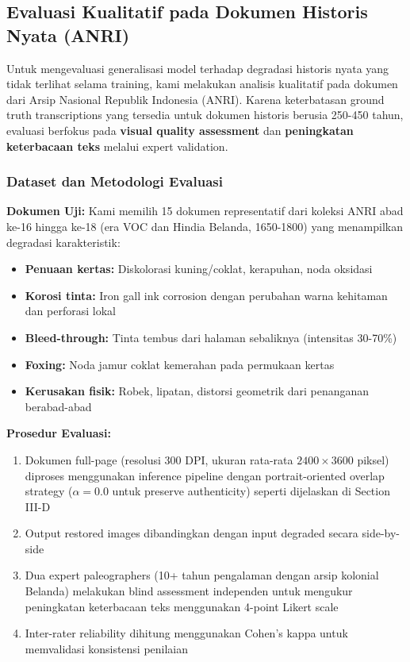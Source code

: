 
\subsection{Evaluasi Kualitatif pada Dokumen Historis Nyata (ANRI)}

Untuk mengevaluasi generalisasi model terhadap degradasi historis nyata yang tidak terlihat selama training, kami melakukan analisis kualitatif pada dokumen dari Arsip Nasional Republik Indonesia (ANRI). Karena keterbatasan ground truth transcriptions yang tersedia untuk dokumen historis berusia 250-450 tahun, evaluasi berfokus pada \textbf{visual quality assessment} dan \textbf{peningkatan keterbacaan teks} melalui expert validation.

\subsubsection{Dataset dan Metodologi Evaluasi}

\textbf{Dokumen Uji:} Kami memilih 15 dokumen representatif dari koleksi ANRI abad ke-16 hingga ke-18 (era VOC dan Hindia Belanda, 1650-1800) yang menampilkan degradasi karakteristik:
\begin{itemize}
    \item \textbf{Penuaan kertas:} Diskolorasi kuning/coklat, kerapuhan, noda oksidasi
    \item \textbf{Korosi tinta:} Iron gall ink corrosion dengan perubahan warna kehitaman dan perforasi lokal
    \item \textbf{Bleed-through:} Tinta tembus dari halaman sebaliknya (intensitas 30-70\%)
    \item \textbf{Foxing:} Noda jamur coklat kemerahan pada permukaan kertas
    \item \textbf{Kerusakan fisik:} Robek, lipatan, distorsi geometrik dari penanganan berabad-abad
\end{itemize}

\textbf{Prosedur Evaluasi:}
\begin{enumerate}
    \item Dokumen full-page (resolusi 300 DPI, ukuran rata-rata $2400 \times 3600$ piksel) diproses menggunakan inference pipeline dengan portrait-oriented overlap strategy ($\alpha=0.0$ untuk preserve authenticity) seperti dijelaskan di Section III-D
    \item Output restored images dibandingkan dengan input degraded secara side-by-side
    \item Dua expert paleographers (10+ tahun pengalaman dengan arsip kolonial Belanda) melakukan blind assessment independen untuk mengukur peningkatan keterbacaan teks menggunakan 4-point Likert scale
    \item Inter-rater reliability dihitung menggunakan Cohen's kappa untuk memvalidasi konsistensi penilaian
\end{enumerate}


